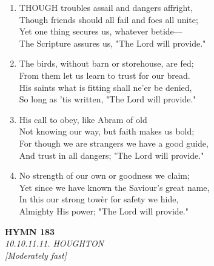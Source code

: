 \begin{enumerate}
    \item THOUGH troubles assail and dangers affright, \\
        Though friends should all fail and foes all unite; \\
        Yet one thing secures us, whatever betide--- \\
        The Scripture assures us, "The Lord will provide."

    \item The birds, without barn or storehouse, are fed; \\
        From them let us learn to trust for our bread. \\
        His saints what is fitting shall ne'er be denied, \\
        So long as 'tis written, "The Lord will provide."

    \item His call to obey, like Abram of old \\
        Not knowing our way, but faith makes us bold; \\
        For though we are strangers we have a good guide, \\
        And trust in all dangers; "The Lord will provide."

    \item No strength of our own or goodness we claim; \\
        Yet since we have known the Saviour's great name, \\
        In this our strong tow\`er for safety we hide, \\
        Almighty His power; "The Lord will provide."

\end{enumerate}

\newpage
\begin{center}
    {\Large \textbf{HYMN 183}}
    \\
    \textit{10.10.11.11. HOUGHTON}
    \\
    \textit{\small [Moderately fast]}
\end{center}
\vspace{1em}

